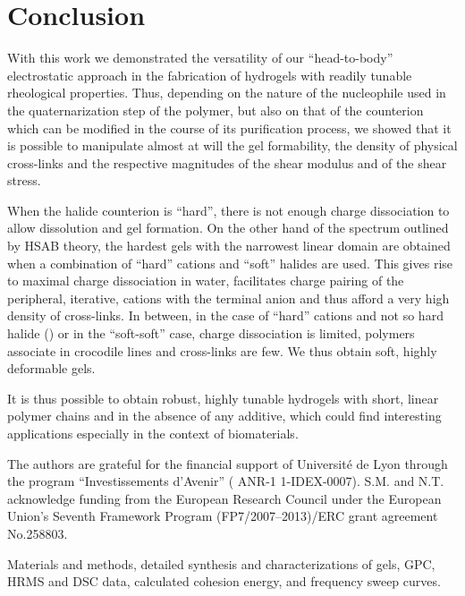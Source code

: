 \documentclass[journal=jacsat,manuscript=article]{achemso}
\begin{document}
\section{Conclusion}
With this work we demonstrated the versatility of our ``head-to-body'' electrostatic approach in the fabrication of hydrogels with readily tunable rheological properties. Thus, depending on the nature of the nucleophile used in the quaternarization step of the polymer, but also on that of the counterion which can be modified in the course of its purification process, we showed that it is possible to manipulate almost at will the gel formability, the density of physical cross-links and the respective magnitudes of the shear modulus and of the shear stress. 

When the halide counterion is ``hard'', there is not enough charge dissociation to allow dissolution and gel formation. On the other hand of the spectrum outlined by HSAB theory, the hardest gels with the narrowest linear domain are obtained when a combination of ``hard'' cations and ``soft'' halides are used. This gives rise to maximal charge dissociation in water, facilitates charge pairing of the peripheral, iterative, cations with the terminal anion and thus afford a very high density of cross-links. In between, in the case of ``hard'' cations and not so hard halide () or in the ``soft-soft'' case, charge dissociation is limited, polymers associate in crocodile lines and cross-links are few. We thus obtain soft, highly deformable gels.

It is thus possible to obtain robust, highly tunable hydrogels with short, linear polymer chains and in the absence of any additive, which could find interesting applications especially in the context of biomaterials.

\begin{acknowledgement}
The authors are grateful for the financial support of Université de Lyon through the program ``Investissements d'Avenir'' ( ANR-1 1-IDEX-0007). S.M. and N.T. acknowledge funding from the European Research Council under the European Union's Seventh Framework Program (FP7/2007–2013)/ERC grant agreement No.258803.
\end{acknowledgement}

\begin{suppinfo}

Materials and methods, detailed synthesis and characterizations of gels, GPC, HRMS and DSC data, calculated cohesion energy, and frequency sweep curves.

\end{suppinfo}


\end{document}
